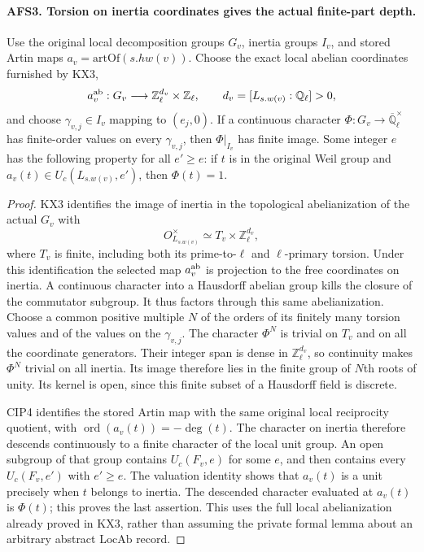 \documentclass[11pt,a4paper]{article}
\numberwithin{equation}{section}
\theoremstyle{remark}\newtheorem{remark}[theorem]{Remark}
\begin{document}
\paragraph{AFS3. Torsion on inertia coordinates gives the actual finite-part depth.}
\label{claim:AFS3}
Use the original local decomposition groups $G_v$, inertia groups
$I_v$, and stored Artin maps $a_v=\mathrm{artOf}(s.hw(v))$.
Choose the exact local abelian coordinates furnished by KX3,
\[
 a_v^{\rm ab}:G_v\longrightarrow
            \mathbb Z_\ell^{d_v}\times\mathbb Z_\ell,
 \qquad d_v=[L_{s.w(v)}:\mathbb Q_\ell]>0,
\]
and choose $\gamma_{v,j}\in I_v$ mapping to $(e_j,0)$.
If a continuous character
$\Phi:G_v\to\overline{\mathbb Q}_\ell^{\times}$ has finite-order
values on every $\gamma_{v,j}$, then $\Phi|_{I_v}$ has finite
image.  Some integer $e$ has the following property for all
$e'\geq e$: if $t$ is in the original Weil group and
$a_v(t)\in U_c(L_{s.w(v)},e')$, then $\Phi(t)=1$.
\begin{proof}
KX3 identifies the image of inertia in the topological
abelianization of the actual $G_v$ with
\[
  O_{L_{s.w(v)}}^{\times}\simeq
       T_v\times\mathbb Z_\ell^{d_v},
\]
where $T_v$ is finite, including both its prime-to-$\ell$ and
$\ell$-primary torsion.  Under this identification the selected
map $a_v^{\rm ab}$ is projection to the free coordinates on
inertia.  A continuous character into a Hausdorff abelian group
kills the closure of the commutator subgroup.  It thus factors
through this same abelianization.  Choose a common positive
multiple $N$ of the orders of its finitely many torsion values
and of the values on the $\gamma_{v,j}$.  The character $\Phi^N$
is trivial on $T_v$ and on all the coordinate generators.
Their integer span is dense in $\mathbb Z_\ell^{d_v}$, so
continuity makes $\Phi^N$ trivial on all inertia.  Its image
therefore lies in the finite group of $N$th roots of unity.
Its kernel is open, since this finite subset of a Hausdorff
field is discrete.

CIP4 identifies the stored Artin map with the same original
local reciprocity quotient, with
$\operatorname{ord}(a_v(t))=-\deg(t)$.  The character on inertia
therefore descends continuously to a finite character of the
local unit group.  An open subgroup of that group contains
$U_c(F_v,e)$ for some $e$, and then contains every
$U_c(F_v,e')$ with $e'\geq e$.  The valuation identity shows
that $a_v(t)$ is a unit precisely when $t$ belongs to inertia.
The descended character evaluated at $a_v(t)$ is $\Phi(t)$;
this proves the last assertion.  This uses the full local
abelianization already proved in KX3, rather than assuming
the private formal lemma about an arbitrary abstract
$\mathrm{LocAb}$ record.
\end{proof}
\end{document}
